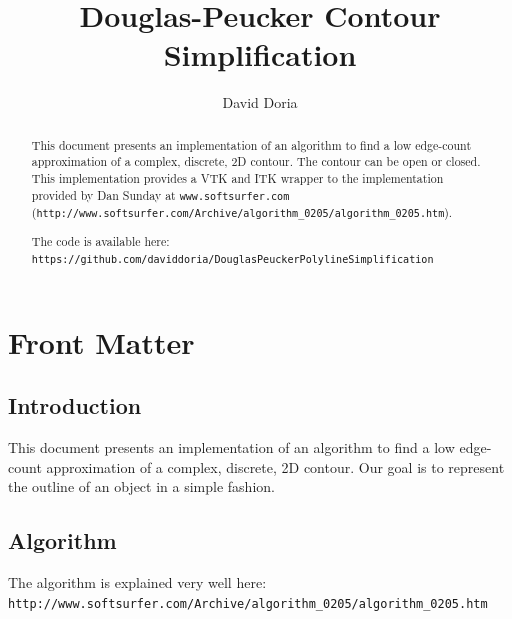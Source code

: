 \documentclass{InsightArticle}
\title{Douglas-Peucker Contour Simplification}
\author{David Doria}
\newcommand{\IJhandlerIDnumber}{3302}
\begin{document}
\IJhandlefooter{\IJhandlerIDnumber}


\ifpdf
\else
\fi


\maketitle


\ifhtml
\chapter*{Front Matter\label{front}}
\fi

\begin{abstract}
\noindent

This document presents an implementation of an algorithm to find a low edge-count approximation of a complex, discrete, 2D contour. The contour can be open or closed. This implementation provides a VTK and ITK wrapper to the implementation provided by Dan Sunday at \verb|www.softsurfer.com| (\verb|http://www.softsurfer.com/Archive/algorithm_0205/algorithm_0205.htm|).

The code is available here:
\verb|https://github.com/daviddoria/DouglasPeuckerPolylineSimplification|

\end{abstract}

\IJhandlenote{\IJhandlerIDnumber}

\tableofcontents
\section{Introduction}
This document presents an implementation of an algorithm to find a low edge-count approximation of a complex, discrete, 2D  contour. Our goal is to represent the outline of an object in a simple fashion.

\section{Algorithm}
\label{sec:Algorithm}
The algorithm is explained very well here:
\verb|http://www.softsurfer.com/Archive/algorithm_0205/algorithm_0205.htm|
\end{document}
